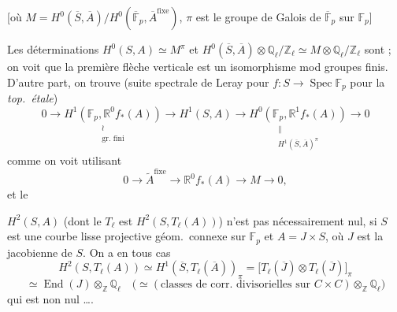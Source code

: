 \documentclass[11pt,a4paper]{article}
\begin{document}

[où $M = H^{0}(\overline{S}, \overline{A}) / H^{0}(\overline{\mathbb{F}}_{p}, \overline{A}^{\mathrm{fixe}})$,
$\pi$ est le groupe de Galois de $\overline{\mathbb{F}}_{p}$ sur
$\mathbb{F}_{p}$]

Les déterminations $H^{0}(S, A) \simeq M^{\pi}$ et
$H^{0}(\overline{S}, \overline{A}) \otimes \mathbb{Q}_{\ell}/\mathbb{Z}_{\ell} \simeq M \otimes \mathbb{Q}_{\ell}/\mathbb{Z}_{\ell}$
sont  ; on voit que la première flèche verticale est un
isomorphisme mod groupes finis. D'autre part, on trouve (suite spectrale de
Leray pour $f : S \to \operatorname{Spec} \mathbb{F}_{p}$ pour la
\emph{top.\ étale})
\[
  0 \longrightarrow \underset{\substack{\wr \\ \text{gr.\ fini}}}{H^{1}(\mathbb{F}_{p}, \mathbb{R}^{0}f_{*}(A))} \longrightarrow H^{1}(S, A) \longrightarrow \underset{\substack{\| \\ H^{1}(\overline{S}, \overline{A})^{\pi}}}{H^{0}(\mathbb{F}_{p}, \mathbb{R}^{1}f_{*}(A))} \longrightarrow 0
\]
comme on voit utilisant
\[
  0 \longrightarrow \widetilde{A}^{\mathrm{fixe}} \longrightarrow \mathbb{R}^{0}f_{*}(A) \longrightarrow M \longrightarrow 0 ,
\]
et le


$H^{2}(S, A)$ \struck{\ill{}} (dont le $T_{\ell}$ est
$H^{2}(S, T_{\ell}(A))$) n'est pas nécessairement nul,
 \struck{\ill{}} si $S$ est une courbe lisse projective
géom.\ connexe sur $\mathbb{F}_{p}$ et $A = J \times S$, où $J$ est la
jacobienne de $S$. On a en tous cas
\[
  H^{2}(S, T_{\ell}(A)) \simeq H^{1}(\overline{S}, T_{\ell}(\overline{A}))_{\pi} = \bigl[ T_{\ell}(\overline{J}) \otimes T_{\ell}(\overline{J}) \bigr]_{\pi}
\]
\[
  \simeq \operatorname{End}(J) \otimes_{\mathbb{Z}} \mathbb{Q}_{\ell} \quad \bigl( \simeq (\text{classes de corr.\ divisorielles sur } C \times C) \otimes_{\mathbb{Z}} \mathbb{Q}_{\ell} \bigr)
\]
qui est non nul ….
\end{document}
